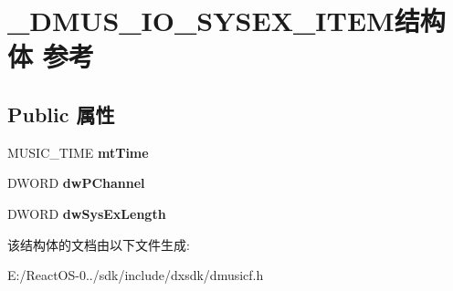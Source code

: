 \hypertarget{struct___d_m_u_s___i_o___s_y_s_e_x___i_t_e_m}{}\section{\+\_\+\+D\+M\+U\+S\+\_\+\+I\+O\+\_\+\+S\+Y\+S\+E\+X\+\_\+\+I\+T\+E\+M结构体 参考}
\label{struct___d_m_u_s___i_o___s_y_s_e_x___i_t_e_m}
\subsection*{Public 属性}
\begin{DoxyCompactItemize}
\item 
\mbox{\label{struct___d_m_u_s___i_o___s_y_s_e_x___i_t_e_m_af051d2000564d008eed3f6d526b2b97c}} 
M\+U\+S\+I\+C\+\_\+\+T\+I\+ME {\bfseries mt\+Time}
\item 
\mbox{\label{struct___d_m_u_s___i_o___s_y_s_e_x___i_t_e_m_afe68a49d89944454c8cd068b8a190593}} 
D\+W\+O\+RD {\bfseries dw\+P\+Channel}
\item 
\mbox{\label{struct___d_m_u_s___i_o___s_y_s_e_x___i_t_e_m_ab2e37d60bd040fc6fe51e3e92f83e802}} 
D\+W\+O\+RD {\bfseries dw\+Sys\+Ex\+Length}
\end{DoxyCompactItemize}


该结构体的文档由以下文件生成\+:\begin{DoxyCompactItemize}
\item 
E\+:/\+React\+O\+S-\/0../sdk/include/dxsdk/dmusicf.\+h\end{DoxyCompactItemize}
